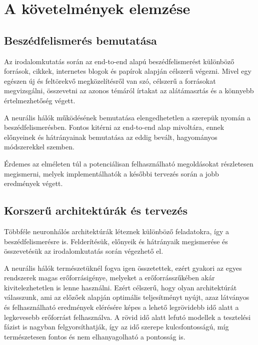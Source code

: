 \chapter{A követelmények elemzése}

\section{Beszédfelismerés bemutatása}

Az irodalomkutatás során az end-to-end alapú beszédfelismerést különböző források, cikkek, internetes blogok és papírok alapján célszerű végezni. Mivel egy egészen új és feltörekvő megközelítésről van szó, célszerű a forrásokat megvizsgálni, összevetni az azonos témáról írtakat az alátámasztás és a könnyebb értelmezhetőség végett.

A neurális hálók működésének bemutatása elengedhetetlen a szerepük nyomán a beszédfelismerésben. Fontos kitérni az end-to-end alap mivoltára, ennek előnyeinek és hátrányainak bemutatása az eddig bevált, hagyományos módszerekkel szemben.

Érdemes az elméleten túl a potenciálisan felhasználható megoldásokat részletesen megismerni, melyek implementálhatók a későbbi tervezés során a jobb eredmények végett.

\section{Korszerű architektúrák és tervezés}

Többféle neuronhálós architektúrák léteznek különböző feladatokra, így a beszédfelismerésre is. Felderítésük, előnyeik és hátrányaik megismerése és összevetésük az irodalomkutatás során végezhető el. 

A neurális hálók természetüknél fogva igen összetettek, ezért gyakori az egyes rendszerek magas erőforrásigénye, melyeket a erőforrásszűkében akár kivitelezhetetlen is lenne használni. Ezért célszerű, hogy olyan architektúrát válasszunk, ami az előzőek alapján optimális teljesítményt nyújt, azaz látványos és felhasználható eredmények elérésére képes a lehető legrövidebb idő alatt a legkevesebb erőforrást felhasználva. A rövid idő alatt lefutó modellek a tesztelési fázist is nagyban felgyorsíthatják, így az idő szerepe kulcsfontosságú, míg természetesen fontos és nem elhanyagolható a pontosság is.

